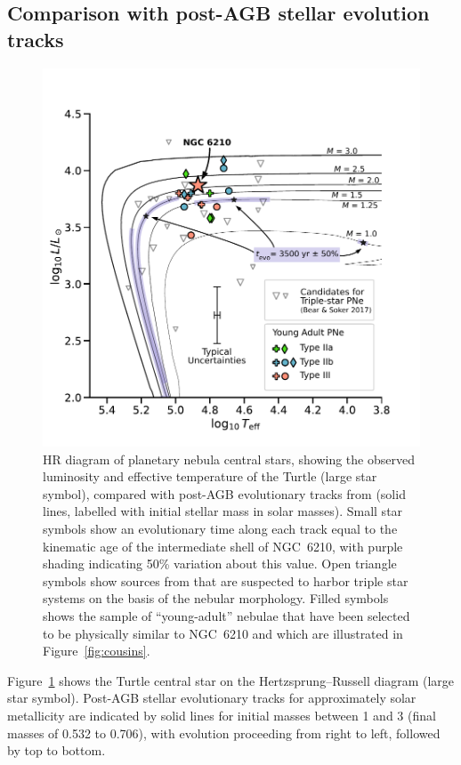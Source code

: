 \documentclass[useAMS, usenatbib]{mnras}
\begin{document}
\subsection{Comparison with post-AGB stellar evolution tracks}
\label{sec:comparison-with-post}
\begin{figure}
  \centering
  \includegraphics[width=\linewidth]{figs/hr-pne-annotated}
  \caption{
    HR diagram of planetary nebula central stars,
    showing the observed luminosity and effective temperature of the Turtle
    (large star symbol),
    compared with post-AGB evolutionary tracks from
    \citet{Miller-Bertolami:2016a}
    (solid lines, labelled with initial stellar mass in solar masses).
    Small star symbols show an evolutionary time along each track equal
    to the kinematic age of the intermediate shell of NGC~6210,
    with purple shading indicating 50\% variation about this value.
    Open triangle symbols show sources from \citet{Bear:2017a}
    that are suspected to harbor triple star systems on the basis of the nebular morphology.
    Filled symbols shows the sample of ``young-adult'' nebulae
    that have been selected to be physically similar to NGC~6210
    and which are illustrated in Figure~\ref{fig:cousins}.
  }
  \label{fig:hr-diagram}
\end{figure}

Figure~\ref{fig:hr-diagram} shows the Turtle central star on
the Hertzsprung--Russell diagram (large star symbol).
Post-AGB stellar evolutionary tracks for approximately solar metallicity \citep{Miller-Bertolami:2016a} are indicated by solid lines for initial masses between \SI{1}{\msun} and \SI{3}{\msun}
(final masses of \SI{0.532}{\msun} to \SI{0.706}{\msun}),
with evolution proceeding from right to left, followed by top to bottom.
\end{document}
